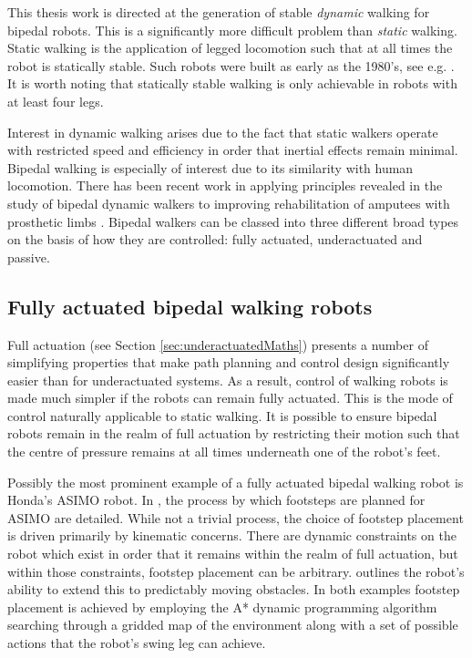 This thesis work is directed at the generation of stable \textit{dynamic} walking for bipedal robots. This is a significantly more difficult problem than \textit{static} walking. Static walking is the application of legged locomotion such that at all times the robot is statically stable. Such robots were built as early as the 1980's, see e.g. \cite{russell1983odex, waldron1986adaptive}. It is worth noting that statically stable walking is only achievable in robots with at least four legs.

Interest in dynamic walking arises due to the fact that static walkers operate with restricted speed and efficiency in order that inertial effects remain minimal. Bipedal walking is especially of interest due to its similarity with human locomotion. There has been recent work in applying principles revealed in the study of bipedal dynamic walkers to improving rehabilitation of amputees with prosthetic limbs \cite{martinpredicting}. Bipedal walkers can be classed into three different broad types on the basis of how they are controlled: fully actuated, underactuated and passive.

\subsection{Fully actuated bipedal walking robots}
Full actuation (see Section \ref{sec:underactuatedMaths}) presents a number of simplifying properties that make path planning and control design significantly easier than for underactuated systems. As a result, control of walking robots is made much simpler if the robots can remain fully actuated. This is the mode of control naturally applicable to static walking. It is possible to ensure bipedal robots remain in the realm of full actuation by restricting their motion such that the centre of pressure remains at all times underneath one of the robot's feet.

Possibly the most prominent example of a fully actuated bipedal walking robot is Honda's ASIMO robot. In \cite{chestnutt2005footstep}, the process by which footsteps are planned for ASIMO are detailed. While not a trivial process, the choice of footstep placement is driven primarily by kinematic concerns. There are dynamic constraints on the robot which exist in order that it remains within the realm of full actuation, but within those constraints, footstep placement can be arbitrary. \cite{chestnutt2007locomotion} outlines the robot's ability to extend this to predictably moving obstacles. In both examples footstep placement is achieved by employing the A* dynamic programming algorithm searching through a gridded map of the environment along with a set of possible actions that the robot's swing leg can achieve.

